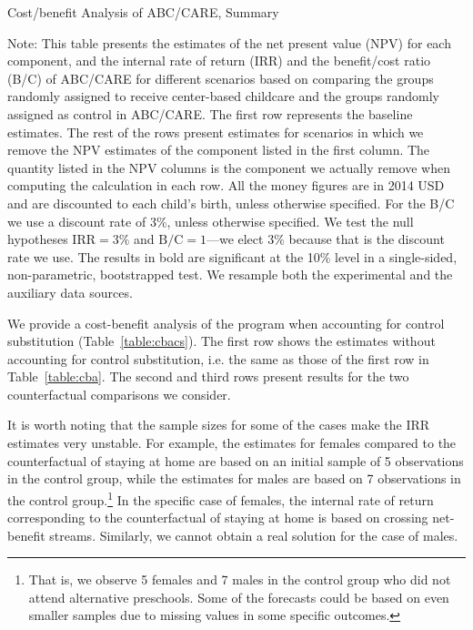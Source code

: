\begin{table}[H]
\centering
\caption{Cost/benefit Analysis of ABC/CARE, Summary}\label{table:cba}
\begin{adjustbox}{max width=\textwidth}
\begin{threeparttable}

\begin{tablenotes}
\footnotesize
\item Note: This table presents the estimates of the net present value (NPV) for each component, and the internal rate of return (IRR) and the benefit/cost ratio (B/C) of ABC/CARE for different scenarios based on comparing the groups randomly assigned to receive center-based childcare and the groups randomly assigned as control in ABC/CARE. The first row represents the baseline estimates. The rest of the rows present estimates for scenarios in which we remove the NPV estimates of the component listed in the first column. The quantity listed in the NPV columns is the component we actually remove when computing the calculation in each row. All the money figures are in 2014 USD and are discounted to each child's birth, unless otherwise specified. For the B/C we use a discount rate of $3\%$, unless otherwise specified. We test the null hypotheses $\text{IRR} = 3\%$ and $\text{B/C} = 1$---we elect $3\%$ because that is the discount rate we use. The results in bold are significant at the 10\% level in a single-sided, non-parametric, bootstrapped test. We resample both the experimental and the auxiliary data sources.
\end{tablenotes}
\end{threeparttable}
\end{adjustbox}
\end{table}

We provide a cost-benefit analysis of the program when accounting for control substitution (Table~\ref{table:cbacs}). The first row shows the estimates without accounting for control substitution, i.e. the same as those of the first row in Table~\ref{table:cba}. The second and third rows present results for the two counterfactual comparisons we consider.

It is worth noting that the sample sizes for some of the cases make the IRR estimates very unstable. For example, the estimates for females compared to the counterfactual of staying at home are based on an initial sample of 5 observations in the control group, while the estimates for males are based on 7  observations in the control group.\footnote{That is, we observe 5 females and 7 males in the control group who did not attend alternative preschools. Some of the forecasts could be based on even smaller samples due to missing values in some specific outcomes.} In the specific case of females, the internal rate of return corresponding to the counterfactual of staying at home is based on crossing net-benefit streams. Similarly, we cannot obtain a real solution for the case of males.

